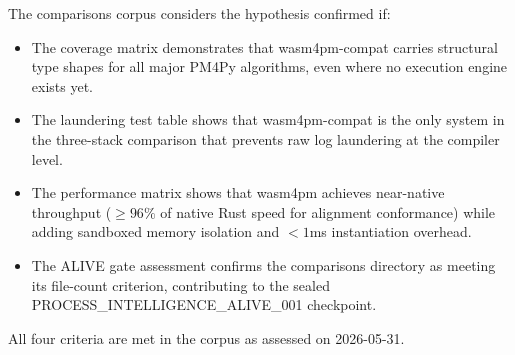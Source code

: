 The comparisons corpus considers the hypothesis confirmed if:

\begin{itemize}
  \item The coverage matrix demonstrates that wasm4pm-compat carries structural
    type shapes for all major PM4Py algorithms, even where no execution engine
    exists yet.
  \item The laundering test table shows that wasm4pm-compat is the only system in
    the three-stack comparison that prevents raw log laundering at the compiler
    level.
  \item The performance matrix shows that wasm4pm achieves near-native throughput
    ($\geq 96\%$ of native Rust speed for alignment conformance) while adding
    sandboxed memory isolation and $< 1$ms instantiation overhead.
  \item The ALIVE gate assessment confirms the comparisons directory as meeting its
    file-count criterion, contributing to the sealed PROCESS\_INTELLIGENCE\_ALIVE\_001
    checkpoint.
\end{itemize}

All four criteria are met in the corpus as assessed on 2026-05-31.

